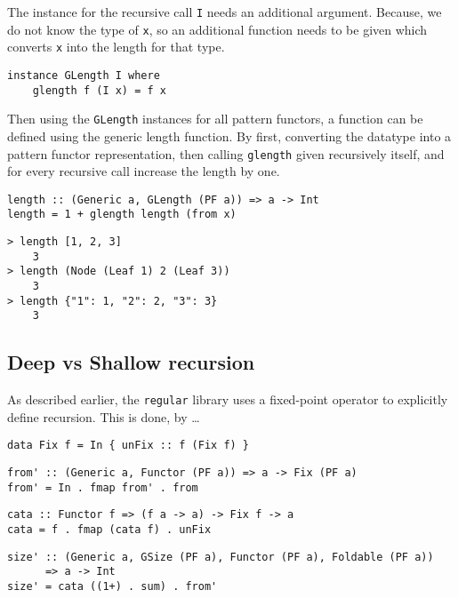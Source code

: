 The instance for the recursive call \texttt{I} needs an additional argument. Because, we do not know the type of \texttt{x}, so an additional function needs to be given which converts \texttt{x} into the length for that type.

\begin{verbatim}
instance GLength I where
    glength f (I x) = f x
\end{verbatim}

Then using the \texttt{GLength} instances for all pattern functors, a function can be defined using the generic length function. By first, converting the datatype into a pattern functor representation, then calling \texttt{glength} given recursively itself, and for every recursive call increase the length by one. 

\begin{verbatim}
length :: (Generic a, GLength (PF a)) => a -> Int
length = 1 + glength length (from x)
\end{verbatim}

\begin{verbatim}
> length [1, 2, 3]
    3
> length (Node (Leaf 1) 2 (Leaf 3))
    3
> length {"1": 1, "2": 2, "3": 3}
    3
\end{verbatim}

\subsection{Deep vs Shallow recursion}

As described earlier, the \texttt{regular} library uses a fixed-point operator to explicitly define recursion. This is done, by \dots

\begin{verbatim}
data Fix f = In { unFix :: f (Fix f) }
\end{verbatim}
    
\begin{verbatim}
from' :: (Generic a, Functor (PF a)) => a -> Fix (PF a)
from' = In . fmap from' . from
\end{verbatim}

\begin{verbatim}
cata :: Functor f => (f a -> a) -> Fix f -> a
cata = f . fmap (cata f) . unFix
\end{verbatim}

\begin{verbatim}
size' :: (Generic a, GSize (PF a), Functor (PF a), Foldable (PF a)) 
      => a -> Int
size' = cata ((1+) . sum) . from'
\end{verbatim}


